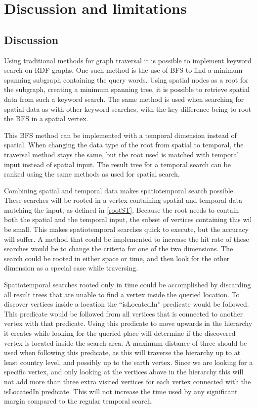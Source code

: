 \chapter{Discussion and limitations}
\label{cha:Discussion}

\section{Discussion}
\label{sec:Discussion}
Using traditional methods for graph traversal it is possible to implement keyword search on RDF graphs. One such method is the use of BFS to find a minimum spanning subgraph containing the query words. Using spatial nodes as a root for the subgraph, creating a minimum spanning tree, it is possible to retrieve spatial data from such a keyword search. The same method is used when searching for spatial data as with other keyword searches, with the key difference being to root the BFS in a spatial vertex.

This BFS method can be implemented with a temporal dimension instead of spatial. When changing the data type of the root from spatial to temporal, the traversal method stays the same, but the root used is matched with temporal input instead of spatial input. The result tree for a temporal search can be ranked using the same methods as used for spatial search.

Combining spatial and temporal data makes spatiotemporal search possible. These searches will be rooted in a vertex containing spatial and temporal data matching the input, as defined in \ref{rootST}. Because the root needs to contain both the spatial and the temporal input, the subset of vertices containing this wil be small. This makes spatiotemporal searches quick to execute, but the accuracy will suffer. A method that could be implemented to increase the hit rate of these searches would be to change the criteria for one of the two dimensions. The search could be rooted in either space or time, and then look for the other dimension as a special case while traversing.

Spatiotemporal searches rooted only in time could be accomplished by discarding all result trees that are unable to find a vertex inside the queried location. To discover vertices inside a location the ``isLocatedIn'' predicate would be followed. This predicate would be followed from all vertices that is connected to another vertex with that predicate. Using this predicate to move upwards in the hierarchy it creates while looking for the queried place will determine if the discovered vertex is located inside the search area. A maximum distance of three should be used when following this predicate, as this will traverse the hierarchy up to at least country level, and possibly up to the earth vertex. Since we are looking for a specific vertex, and only looking at the vertices above in the hierarchy this will not add more than three extra visited vertices for each vertex connected with the isLocatedIn predicate. This will not increase the time used by any significant margin compared to the regular temporal search.


